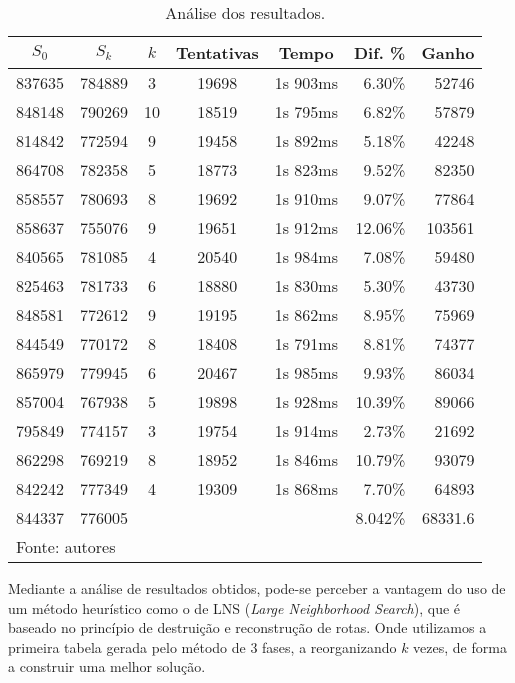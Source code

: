 \documentclass[12pt,a4paper]{article}
\renewcommand*{\arraystretch}{1.2}
\numberwithin{figure}{section}
\numberwithin{table}{section}
\begin{document}
\begin{table}[H]
	\renewcommand{\arraystretch}{1}
	\centering
	\caption{Análise dos resultados.}
	\label{tab:resultados}
	\begin{tabular}{*{5}{c} r r}
		\toprule 
		$S_{0}$ & $S_{k}$ & $k$ & Tentativas & Tempo & Dif. \% & Ganho \\ 
		\midrule
		837635 & 784889 &  3 & 19698 & 1s 903ms &  6.30\% &  52746 \\
		848148 & 790269 & 10 & 18519 & 1s 795ms &  6.82\% &  57879 \\
		814842 & 772594 &  9 & 19458 & 1s 892ms &  5.18\% &  42248 \\
		864708 & 782358 &  5 & 18773 & 1s 823ms &  9.52\% &  82350 \\
		858557 & 780693 &  8 & 19692 & 1s 910ms &  9.07\% &  77864 \\
		858637 & 755076 &  9 & 19651 & 1s 912ms & 12.06\% & 103561 \\
		840565 & 781085 &  4 & 20540 & 1s 984ms &  7.08\% &  59480 \\
		825463 & 781733 &  6 & 18880 & 1s 830ms &  5.30\% &  43730 \\
		848581 & 772612 &  9 & 19195 & 1s 862ms &  8.95\% &  75969 \\
		844549 & 770172 &  8 & 18408 & 1s 791ms &  8.81\% &  74377 \\
		865979 & 779945 &  6 & 20467 & 1s 985ms &  9.93\% &  86034 \\
		857004 & 767938 &  5 & 19898 & 1s 928ms & 10.39\% &  89066 \\
		795849 & 774157 &  3 & 19754 & 1s 914ms &  2.73\% &  21692 \\
		862298 & 769219 &  8 & 18952 & 1s 846ms & 10.79\% &  93079 \\
		842242 & 777349 &  4 & 19309 & 1s 868ms &  7.70\% &  64893 \\
		\midrule
		844337 & 776005 &    &       &          &  8.042\% &  68331.6 \\
		\bottomrule
		\multicolumn{6}{l}{\footnotesize Fonte: autores}
	\end{tabular}
\end{table}

Mediante a análise de resultados obtidos, pode-se perceber a vantagem do uso de um método heurístico como o de LNS (\textit{Large Neighborhood Search}), que é baseado no princípio de destruição e reconstrução de rotas. Onde utilizamos a primeira tabela gerada pelo método de 3 fases, a reorganizando $k$ vezes, de forma a construir uma melhor solução. 
\end{document}
